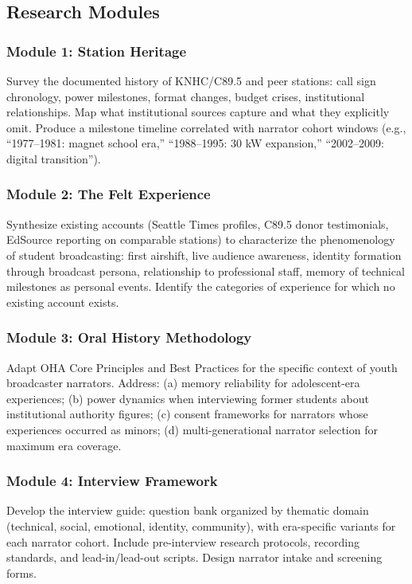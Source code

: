 \documentclass[11pt,letterpaper]{article}
\begin{document}
\subsection{Research Modules}

\subsubsection{Module 1: Station Heritage}
Survey the documented history of KNHC/C89.5 and peer stations: call sign chronology, power milestones, format changes, budget crises, institutional relationships. Map what institutional sources capture and what they explicitly omit. Produce a milestone timeline correlated with narrator cohort windows (e.g., ``1977--1981: magnet school era,'' ``1988--1995: 30 kW expansion,'' ``2002--2009: digital transition'').

\subsubsection{Module 2: The Felt Experience}
Synthesize existing accounts (Seattle Times profiles, C89.5 donor testimonials, EdSource reporting on comparable stations) to characterize the phenomenology of student broadcasting: first airshift, live audience awareness, identity formation through broadcast persona, relationship to professional staff, memory of technical milestones as personal events. Identify the categories of experience for which no existing account exists.

\subsubsection{Module 3: Oral History Methodology}
Adapt OHA Core Principles and Best Practices for the specific context of youth broadcaster narrators. Address: (a) memory reliability for adolescent-era experiences; (b) power dynamics when interviewing former students about institutional authority figures; (c) consent frameworks for narrators whose experiences occurred as minors; (d) multi-generational narrator selection for maximum era coverage.

\subsubsection{Module 4: Interview Framework}
Develop the interview guide: question bank organized by thematic domain (technical, social, emotional, identity, community), with era-specific variants for each narrator cohort. Include pre-interview research protocols, recording standards, and lead-in/lead-out scripts. Design narrator intake and screening forms.
\end{document}
